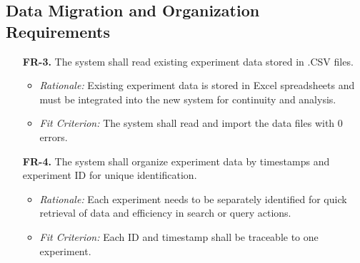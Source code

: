 \documentclass[12pt]{article}
\begin{document}
\subsection{Data Migration and Organization Requirements}
  \begin{enumerate}
    \item[\textbf{FR-3.}] The system shall read existing experiment data stored in .CSV files.
    \begin{itemize}
      \item \textit{Rationale:} Existing experiment data is stored in Excel spreadsheets and must be integrated into the new system for continuity and analysis.
      \item \textit{Fit Criterion:} The system shall read and import the data files with 0 errors.
    \end{itemize}
    \item[\textbf{FR-4.}] The system shall organize experiment data by timestamps and experiment ID for unique identification.
    \begin{itemize}
      \item \textit{Rationale:} Each experiment needs to be separately identified for quick retrieval of data and efficiency in search or query actions.
      \item \textit{Fit Criterion:} Each ID and timestamp shall be traceable to one experiment.
    \end{itemize}
  \end{enumerate}
\end{document}
